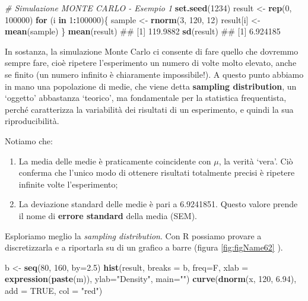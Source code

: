 \documentclass[a4paper,12pt,oneside]{book}
\providecommand{\tightlist}{%
  \setlength{\itemsep}{0pt}\setlength{\parskip}{0pt}}
\newenvironment{Shaded}{\begin{snugshade}}{\end{snugshade}}
\newcommand{\KeywordTok}[1]{\textcolor[rgb]{0.13,0.29,0.53}{\textbf{#1}}}
\newcommand{\DataTypeTok}[1]{\textcolor[rgb]{0.13,0.29,0.53}{#1}}
\newcommand{\DecValTok}[1]{\textcolor[rgb]{0.00,0.00,0.81}{#1}}
\newcommand{\FloatTok}[1]{\textcolor[rgb]{0.00,0.00,0.81}{#1}}
\newcommand{\StringTok}[1]{\textcolor[rgb]{0.31,0.60,0.02}{#1}}
\newcommand{\CommentTok}[1]{\textcolor[rgb]{0.56,0.35,0.01}{\textit{#1}}}
\newcommand{\OtherTok}[1]{\textcolor[rgb]{0.56,0.35,0.01}{#1}}
\newcommand{\ControlFlowTok}[1]{\textcolor[rgb]{0.13,0.29,0.53}{\textbf{#1}}}
\newcommand{\OperatorTok}[1]{\textcolor[rgb]{0.81,0.36,0.00}{\textbf{#1}}}
\newcommand{\NormalTok}[1]{#1}
\theoremstyle{definition}
\theoremstyle{definition}
\theoremstyle{definition}
\theoremstyle{remark}
\begin{document}
\begin{Shaded}
\begin{Highlighting}[]
\CommentTok{# Simulazione MONTE CARLO - Esempio 1}
\KeywordTok{set.seed}\NormalTok{(}\DecValTok{1234}\NormalTok{)}
\NormalTok{result <-}\StringTok{ }\KeywordTok{rep}\NormalTok{(}\DecValTok{0}\NormalTok{, }\DecValTok{100000}\NormalTok{)}
\ControlFlowTok{for}\NormalTok{ (i }\ControlFlowTok{in} \DecValTok{1}\OperatorTok{:}\DecValTok{100000}\NormalTok{)\{}
\NormalTok{  sample <-}\StringTok{ }\KeywordTok{rnorm}\NormalTok{(}\DecValTok{3}\NormalTok{, }\DecValTok{120}\NormalTok{, }\DecValTok{12}\NormalTok{)}
\NormalTok{  result[i] <-}\StringTok{ }\KeywordTok{mean}\NormalTok{(sample)}
\NormalTok{\}}
\KeywordTok{mean}\NormalTok{(result)}
\NormalTok{## [1] 119.9882}
\KeywordTok{sd}\NormalTok{(result)}
\NormalTok{## [1] 6.924185}
\end{Highlighting}
\end{Shaded}

In sostanza, la simulazione Monte Carlo ci consente di fare quello che
dovremmo sempre fare, cioè ripetere l'esperimento un numero di volte
molto elevato, anche se finito (un numero infinito è chiaramente
impossibile!). A questo punto abbiamo in mano una popolazione di medie,
che viene detta \textbf{sampling distribution}, un `oggetto' abbastanza
`teorico', ma fondamentale per la statistica frequentista, perché
caratterizza la variabilità dei risultati di un esperimento, e quindi la
sua riproducibilità.

Notiamo che:

\begin{enumerate}
\def\labelenumi{\arabic{enumi}.}
\tightlist
\item
  La media delle medie è praticamente coincidente con \(\mu\), la verità
  `vera'. Ciò conferma che l'unico modo di ottenere risultati totalmente
  precisi è ripetere infinite volte l'esperimento;
\item
  La deviazione standard delle medie è pari a 6.9241851. Questo valore
  prende il nome di \textbf{errore standard} della media (SEM).
\end{enumerate}

Esploriamo meglio la \emph{sampling distribution}. Con R possiamo
provare a discretizzarla e a riportarla su di un grafico a barre (figura
\ref{fig:figName62} ).

\begin{Shaded}
\begin{Highlighting}[]
\NormalTok{b <-}\StringTok{ }\KeywordTok{seq}\NormalTok{(}\DecValTok{80}\NormalTok{, }\DecValTok{160}\NormalTok{, }\DataTypeTok{by=}\FloatTok{2.5}\NormalTok{)}
\KeywordTok{hist}\NormalTok{(result, }\DataTypeTok{breaks =}\NormalTok{ b, }\DataTypeTok{freq=}\NormalTok{F, }\DataTypeTok{xlab =} \KeywordTok{expression}\NormalTok{(}\KeywordTok{paste}\NormalTok{(m)),}
  \DataTypeTok{ylab=}\StringTok{"Density"}\NormalTok{, }\DataTypeTok{main=}\StringTok{""}\NormalTok{)}
\KeywordTok{curve}\NormalTok{(}\KeywordTok{dnorm}\NormalTok{(x, }\DecValTok{120}\NormalTok{, }\FloatTok{6.94}\NormalTok{), }\DataTypeTok{add =} \OtherTok{TRUE}\NormalTok{, }\DataTypeTok{col =} \StringTok{"red"}\NormalTok{)}
\end{Highlighting}
\end{Shaded}
\end{document}
